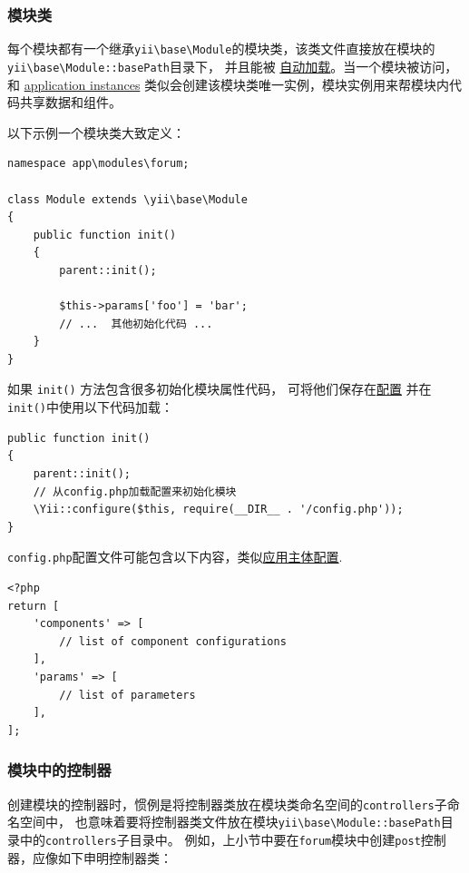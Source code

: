 \subsubsection{模块类 \label{structure-modules.md::module-classes}}
每个模块都有一个继承\texttt{yii{\allowbreak{}\textbackslash}base{\allowbreak{}\textbackslash}Module}的模块类，该类文件直接放在模块的\texttt{yii{\allowbreak{}\textbackslash}base{\allowbreak{}\textbackslash}Module\allowbreak{}::\allowbreak{}basePath}目录下，
并且能被 \hyperref[concept-autoloading.md]{自动加载}。当一个模块被访问，和 \hyperref[structure-applications.md]{application instances}
类似会创建该模块类唯一实例，模块实例用来帮模块内代码共享数据和组件。

以下示例一个模块类大致定义：

\lstset{language=php}\begin{lstlisting}
namespace app\modules\forum;

class Module extends \yii\base\Module
{
    public function init()
    {
        parent::init();

        $this->params['foo'] = 'bar';
        // ...  其他初始化代码 ...
    }
}
\end{lstlisting}
如果 \lstinline|init()| 方法包含很多初始化模块属性代码，
可将他们保存在\hyperref[concept-configurations.md]{配置} 并在\lstinline|init()|中使用以下代码加载：

\lstset{language=php}\begin{lstlisting}
public function init()
{
    parent::init();
    // 从config.php加载配置来初始化模块
    \Yii::configure($this, require(__DIR__ . '/config.php'));
}
\end{lstlisting}
\lstinline|config.php|配置文件可能包含以下内容，类似\hyperref[structure-applications.md::application-configurations]{应用主体配置}.

\lstset{language=php}\begin{lstlisting}
<?php
return [
    'components' => [
        // list of component configurations
    ],
    'params' => [
        // list of parameters
    ],
];
\end{lstlisting}
\subsubsection{模块中的控制器 \label{structure-modules.md::controllers-in-modules}}
创建模块的控制器时，惯例是将控制器类放在模块类命名空间的\lstinline|controllers|子命名空间中，
也意味着要将控制器类文件放在模块\texttt{yii{\allowbreak{}\textbackslash}base{\allowbreak{}\textbackslash}Module\allowbreak{}::\allowbreak{}basePath}目录中的\lstinline|controllers|子目录中。
例如，上小节中要在\lstinline|forum|模块中创建\lstinline|post|控制器，应像如下申明控制器类：

